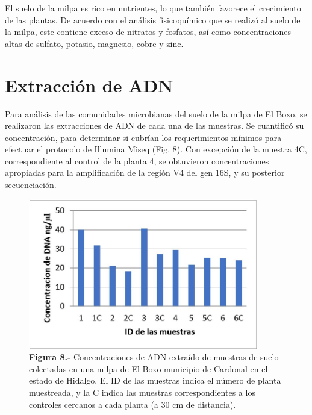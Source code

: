 \documentclass[12pt,letterpaper,oneside]{report}
\begin{document}
\par
El suelo de la milpa es rico en nutrientes, lo que también favorece el crecimiento de las plantas. De acuerdo con el análisis fisicoquímico que se realizó al suelo de la milpa, este contiene exceso de nitratos y fosfatos, así como concentraciones altas de sulfato, potasio, magnesio, cobre y zinc.
\par
\section{Extracción de ADN}
Para análisis de las comunidades microbianas del suelo de la milpa de El Boxo, se realizaron las extracciones de ADN de cada una de las muestras. Se cuantificó su concentración, para determinar si cubrían los requerimientos mínimos para efectuar el protocolo de Illumina Miseq (Fig. 8).
\newpage
Con excepción de la muestra 4C, correspondiente al control de la planta 4, se obtuvieron concentraciones apropiadas para la amplificación de la región V4 del gen 16S, y su posterior secuenciación. 
\begin{figure}[!h]
\centering
\includegraphics[width=10cm]{figuras/IMG_9}
\caption*{\textbf{Figura 8.-} Concentraciones de ADN extraído de muestras de suelo colectadas en una milpa de El Boxo municipio de Cardonal en el estado de Hidalgo. El ID de las muestras indica el número de planta muestreada, y la C indica las muestras correspondientes a los controles cercanos a cada planta (a 30 cm de distancia).}
\label{Figura 9}
\end{figure}
\end{document}
